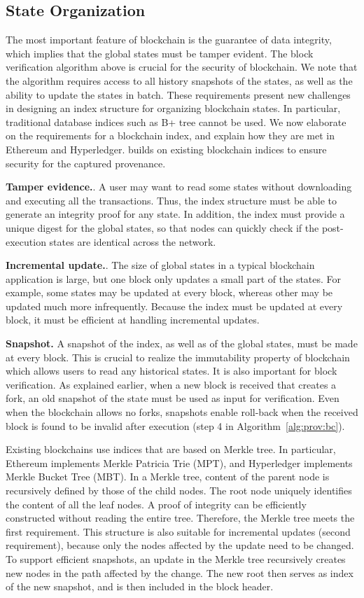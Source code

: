 \subsection{State Organization}
The most important feature of blockchain is the guarantee of data integrity, which implies that the global
states must be tamper evident. The block verification algorithm above is crucial for the security of
blockchain. We note that the algorithm requires access to all history snapshots of the states, as well as the
ability to update the states in batch. These requirements present new challenges in
designing an index structure for organizing blockchain states. In particular, traditional database indices
such as B+ tree cannot be used. We now elaborate on the requirements for a blockchain index, and
explain how they are met in Ethereum and Hyperledger. {\fs} builds on existing blockchain indices to
ensure security for the captured provenance.
  
\textbf{Tamper evidence.}. A user may want to read some states without downloading and
executing all the transactions. Thus, the index structure must be able to generate an integrity proof for any
state. In addition, the index must provide a unique digest for the global states, so that nodes can quickly
check if the post-execution states are identical across the network. 

\textbf{Incremental update.}. The size of global states in a typical blockchain
application is large, but one block only updates a small part of the states. For example, some states may be
updated at every block, whereas other may be updated much more infrequently. Because the index must be
updated at every block, it must be efficient at handling incremental updates. 
  
\textbf{Snapshot.} A snapshot of the index, as well as of the global states, must be
made at every block. This is crucial to realize the immutability property of blockchain which allows users to
read any historical states. It is also important for block verification. As explained earlier, when a new
block is received that creates a fork, an old snapshot of the state must be used as input for verification.
Even when the blockchain allows no forks, snapshots enable roll-back when the received block is found to be
invalid after execution (step 4 in Algorithm~\ref{alg:prov:bc}). 

Existing blockchains use indices that are based on Merkle tree. In particular, Ethereum implements Merkle
Patricia Trie (MPT), and Hyperledger implements Merkle Bucket Tree (MBT). In a Merkle tree,
content of the parent node is recursively defined by those of the child nodes. The root node uniquely
identifies the content of all the leaf nodes. A proof of integrity can be efficiently constructed without
reading the entire tree. Therefore, the Merkle tree meets the first requirement. This structure is also
suitable for incremental updates (second requirement), because only the nodes affected by the update need to
be changed. To support efficient snapshots, an update in the Merkle tree recursively creates new nodes in the
path affected by the change. The new root then serves as index of the new snapshot, and is then
included in the block header.

